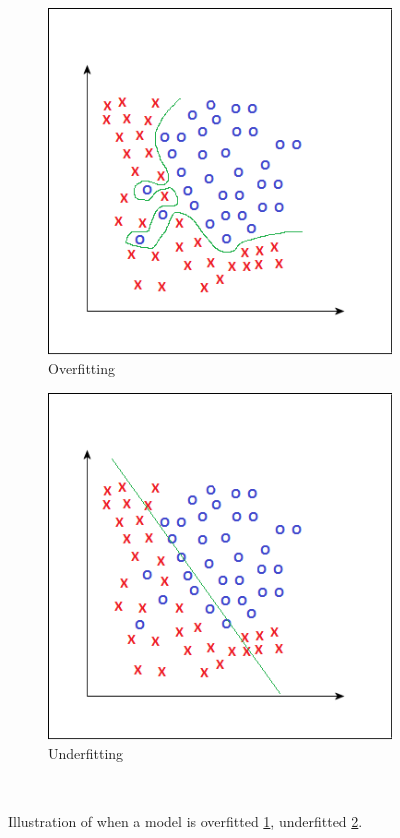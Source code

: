 \documentclass[USenglish]{ifimaster}  %
\begin{document}
	\begin{figure}[h]
		\begin{subfigure}{0.5\linewidth}
			\centering
			\includegraphics[scale=0.4]{Figures/Overfitting}
			\caption{Overfitting}
			\label{fig:over}
		\end{subfigure}%
		\begin{subfigure}{.5\linewidth}
			\centering
			\includegraphics[scale=0.4]{Figures/Underfitting}
			\caption{Underfitting}
			\label{fig:under}
		\end{subfigure}\\[1ex]
	
		\caption[Illustration of when a model is overfitted, underfitted and optimal]{Illustration of when a model is overfitted \ref{fig:over}, underfitted \ref{fig:under}.}
		\label{fig:fitting}	
	\end{figure}
	\FloatBarrier
	
\end{document}
